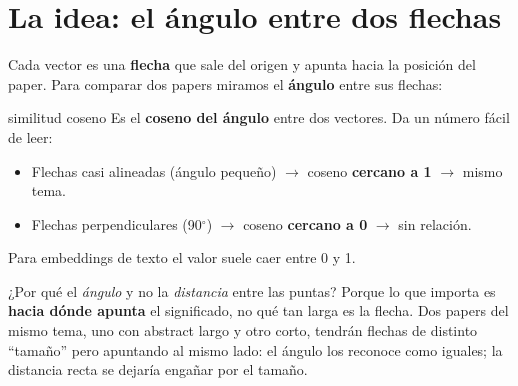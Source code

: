 \documentclass[11pt,a4paper]{article}
\begin{document}
\section{La idea: el ángulo entre dos flechas}

Cada vector es una \textbf{flecha} que sale del origen y apunta hacia la posición del paper.
Para comparar dos papers miramos el \textbf{ángulo} entre sus flechas:

\begin{center}
\end{center}

\begin{concepto}{similitud coseno}
Es el \textbf{coseno del ángulo} entre dos vectores. Da un número fácil de leer:
\begin{itemize}
  \item Flechas casi alineadas (ángulo pequeño) $\rightarrow$ coseno \textbf{cercano a 1}
        $\rightarrow$ mismo tema.
  \item Flechas perpendiculares (90$^\circ$) $\rightarrow$ coseno \textbf{cercano a 0}
        $\rightarrow$ sin relación.
\end{itemize}
Para embeddings de texto el valor suele caer entre 0 y 1.
\end{concepto}

\begin{ojo}
¿Por qué el \emph{ángulo} y no la \emph{distancia} entre las puntas? Porque lo que importa
es \textbf{hacia dónde apunta} el significado, no qué tan larga es la flecha. Dos papers del
mismo tema, uno con abstract largo y otro corto, tendrán flechas de distinto ``tamaño'' pero
apuntando al mismo lado: el ángulo los reconoce como iguales; la distancia recta se dejaría
engañar por el tamaño.
\end{ojo}
\end{document}

